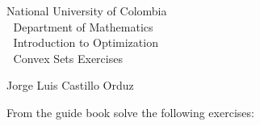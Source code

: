 \documentclass[12pt, oneside]{article}%
\begin{document}
\setlength{\parindent}{0cm}%
\hoffset-0.46cm
\voffset-1.46cm

\begin{window}
\Large  \hspace{0.6cm}\textsf{National University of Colombia} \\
\textcolor{white}{\tiny.}  \Large \hspace{0.6cm} \textsf{Department of Mathematics} \\
\textcolor{white}{\tiny.}   \large\hspace{5.5cm}\textsf{Introduction to Optimization}\\
\textcolor{white}{\tiny.}   \large \hspace{6.2cm}\textsf{Convex Sets Exercises} 
\end{window}


\vspace{0.5cm}
\normalfont
\textsf{Jorge Luis Castillo Orduz} 
\normalsize
\dotfill
\vspace{1cm}


From the guide book solve the following exercises:
\end{document}
